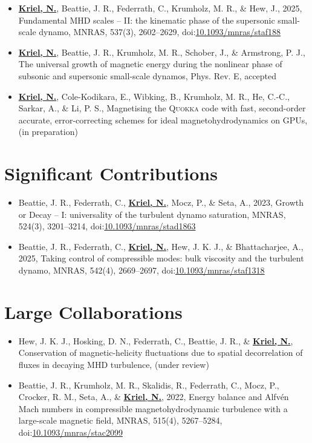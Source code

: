 \documentclass[12pt,twoside]{extreport}
\begin{document}
\begin{itemize}
  \item \underline{\textbf{Kriel, N.}}, Beattie, J. R., Federrath, C., Krumholz, M. R., \& Hew, J., 2025,
  Fundamental MHD scales -- II: the kinematic phase of the supersonic small-scale dynamo,
  MNRAS, 537(3), 2602–2629, doi:\href{https://doi.org/10.1093/mnras/staf188}{10.1093/mnras/staf188}

  \item \underline{\textbf{Kriel, N.}}, Beattie, J. R., Krumholz, M. R., Schober, J., \& Armstrong, P. J.,
  The universal growth of magnetic energy during the nonlinear phase of subsonic and supersonic small-scale dynamos,
  Phys. Rev. E, accepted

  \item \underline{\textbf{Kriel, N.}}, Cole-Kodikara, E., Wibking, B., Krumholz, M. R., He, C.-C., Sarkar, A., \& Li, P. S.,
  Magnetising the \textsc{Quokka} code with fast, second-order accurate, error-correcting schemes for ideal magnetohydrodynamics on GPUs,
  (in preparation)
\end{itemize}

\section*{Significant Contributions}

\begin{itemize}
  \item Beattie, J. R., Federrath, C., \underline{\textbf{Kriel, N.}}, Mocz, P., \& Seta, A., 2023,
  Growth or Decay -- I: universality of the turbulent dynamo saturation,
  MNRAS, 524(3), 3201–3214, doi:\href{https://doi.org/10.1093/mnras/stad1863}{10.1093/mnras/stad1863}

  \item Beattie, J. R., Federrath, C., \underline{\textbf{Kriel, N.}}, Hew, J. K. J., \& Bhattacharjee, A., 2025,
  Taking control of compressible modes: bulk viscosity and the turbulent dynamo,
  MNRAS, 542(4), 2669–2697, doi:\href{https://doi.org/10.1093/mnras/staf1318}{10.1093/mnras/staf1318}
\end{itemize}

\section*{Large Collaborations}

\begin{itemize}
  \item Hew, J. K. J., Hosking, D. N., Federrath, C., Beattie, J. R., \& \underline{\textbf{Kriel, N.}},
  Conservation of magnetic-helicity fluctuations due to spatial decorrelation of fluxes in decaying MHD turbulence,
  (under review)

  \item Beattie, J. R., Krumholz, M. R., Skalidis, R., Federrath, C., Mocz, P., Crocker, R. M., Seta, A., \& \underline{\textbf{Kriel, N.}}, 2022,
  Energy balance and Alfv\'en Mach numbers in compressible magnetohydrodynamic turbulence with a large-scale magnetic field,
  MNRAS, 515(4), 5267–5284, doi:\href{https://doi.org/10.1093/mnras/stac2099}{10.1093/mnras/stac2099}
\end{itemize}
\end{document}
